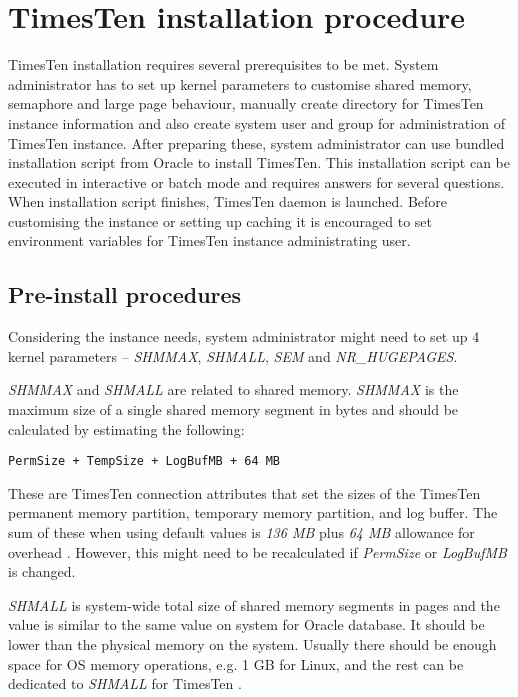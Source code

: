 \documentclass[11pt, letterpaper]{article}
\begin{document}
\section{TimesTen installation procedure}
TimesTen installation requires several prerequisites to be met. System administrator has to set up kernel parameters to customise shared memory, semaphore and large page behaviour, manually create directory for TimesTen instance information and also create system user and group for administration of TimesTen instance. After preparing these, system administrator can use bundled installation script from Oracle to install TimesTen. This installation script can be executed in interactive or batch mode and requires answers for several questions. When installation script finishes, TimesTen daemon is launched. Before customising the instance or setting up caching it is encouraged to set environment variables for TimesTen instance administrating user.
\subsection{Pre-install procedures}
Considering the instance needs, system administrator might need to set up 4 kernel parameters – \emph{SHMMAX}, \emph{SHMALL}, \emph{SEM} and \emph{NR\_HUGEPAGES}\cite{ref_shmvars}.

\emph{SHMMAX} and \emph{SHMALL} are related to shared memory. \emph{SHMMAX} is the maximum size of a single shared memory segment in bytes and should be calculated by estimating the following:

\begin{lstlisting}
PermSize + TempSize + LogBufMB + 64 MB
\end{lstlisting}

These are TimesTen connection attributes that set the sizes of the TimesTen permanent memory partition, temporary memory partition, and log buffer. The sum of these when using default values is \emph{136 MB} plus \emph{64 MB} allowance for overhead \cite{ref_shmmax}\cite{ref_shmmaxvals}. However, this might need to be recalculated if \emph{PermSize} or \emph{LogBufMB} is changed.

\emph{SHMALL} is system-wide total size of shared memory segments in pages and the value is similar to the same value on system for Oracle database. It should be lower than the physical memory on the system. Usually there should be enough space for OS memory operations, e.g. 1 GB for Linux, and the rest can be dedicated to \emph{SHMALL} for TimesTen \cite{ref_shm}.
\end{document}
